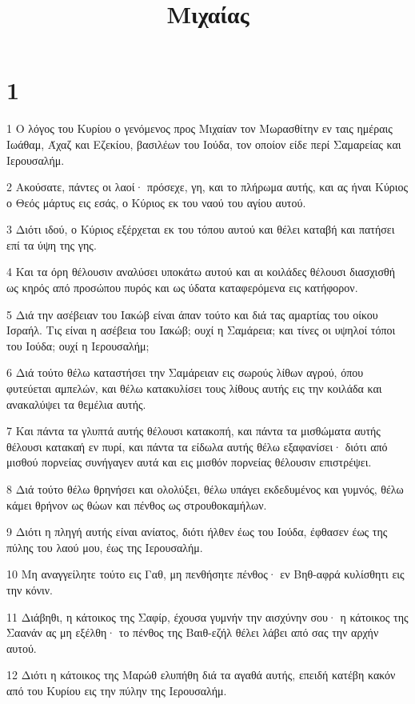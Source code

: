 

\title{Μιχαίας}


\chapter{1}

\par 1 Ο λόγος του Κυρίου ο γενόμενος προς Μιχαίαν τον Μωρασθίτην εν ταις ημέραις Ιωάθαμ, Άχαζ και Εζεκίου, βασιλέων του Ιούδα, τον οποίον είδε περί Σαμαρείας και Ιερουσαλήμ.
\par 2 Ακούσατε, πάντες οι λαοί· πρόσεχε, γη, και το πλήρωμα αυτής, και ας ήναι Κύριος ο Θεός μάρτυς εις εσάς, ο Κύριος εκ του ναού του αγίου αυτού.
\par 3 Διότι ιδού, ο Κύριος εξέρχεται εκ του τόπου αυτού και θέλει καταβή και πατήσει επί τα ύψη της γης.
\par 4 Και τα όρη θέλουσιν αναλύσει υποκάτω αυτού και αι κοιλάδες θέλουσι διασχισθή ως κηρός από προσώπου πυρός και ως ύδατα καταφερόμενα εις κατήφορον.
\par 5 Διά την ασέβειαν του Ιακώβ είναι άπαν τούτο και διά τας αμαρτίας του οίκου Ισραήλ. Τις είναι η ασέβεια του Ιακώβ; ουχί η Σαμάρεια; και τίνες οι υψηλοί τόποι του Ιούδα; ουχί η Ιερουσαλήμ;
\par 6 Διά τούτο θέλω καταστήσει την Σαμάρειαν εις σωρούς λίθων αγρού, όπου φυτεύεται αμπελών, και θέλω κατακυλίσει τους λίθους αυτής εις την κοιλάδα και ανακαλύψει τα θεμέλια αυτής.
\par 7 Και πάντα τα γλυπτά αυτής θέλουσι κατακοπή, και πάντα τα μισθώματα αυτής θέλουσι κατακαή εν πυρί, και πάντα τα είδωλα αυτής θέλω εξαφανίσει· διότι από μισθού πορνείας συνήγαγεν αυτά και εις μισθόν πορνείας θέλουσιν επιστρέψει.
\par 8 Διά τούτο θέλω θρηνήσει και ολολύξει, θέλω υπάγει εκδεδυμένος και γυμνός, θέλω κάμει θρήνον ως θώων και πένθος ως στρουθοκαμήλων.
\par 9 Διότι η πληγή αυτής είναι ανίατος, διότι ήλθεν έως του Ιούδα, έφθασεν έως της πύλης του λαού μου, έως της Ιερουσαλήμ.
\par 10 Μη αναγγείλητε τούτο εις Γαθ, μη πενθήσητε πένθος· εν Βηθ-αφρά κυλίσθητι εις την κόνιν.
\par 11 Διάβηθι, η κάτοικος της Σαφίρ, έχουσα γυμνήν την αισχύνην σου· η κάτοικος της Σαανάν ας μη εξέλθη· το πένθος της Βαιθ-εζήλ θέλει λάβει από σας την αρχήν αυτού.
\par 12 Διότι η κάτοικος της Μαρώθ ελυπήθη διά τα αγαθά αυτής, επειδή κατέβη κακόν από του Κυρίου εις την πύλην της Ιερουσαλήμ.
